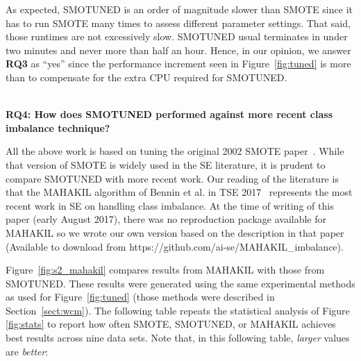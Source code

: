 \documentclass[sigconf]{acmart}
\theoremstyle{break}
\theoremstyle{break}
\newcommand{\sma}{{\sc SMOTE}}
\newcommand{\smb}{{\sc SMOTUNED}}
\begin{document}
As expected,  {\smb} is an order of magnitude slower than {\sma} since
it has to run {\sma} many times to assess different parameter settings.
That said, those runtimes are not excessively slow.
{\smb} usual terminates in under two minutes and never more than half an hour.
Hence, in  our opinion, we answer {\bf RQ3} as ``yes'' since the   performance increment
seen in Figure~\ref{fig:tuned} is more than to compensate for the extra CPU required for {\smb}.

\noindent
{\bf \\RQ4: How does SMOTUNED performed against more recent class imbalance technique?}

All the above work is based on tuning the original 2002 {\sma} paper~\cite{chawla2002smote}. While that
version of {\sma} is widely used in the SE literature, 
it is prudent to compare {\smb} with more recent work.
Our reading
of the literature is that the MAHAKIL algorithm  of Bennin et al. in TSE 2017~\cite{bennin2017mahakil} represents the most recent work in  SE on handling  
class imbalance.  
At the time of writing of this paper (early August 2017), there was no reproduction package available for MAHAKIL so we wrote our own version
based on the description in that paper %
(Available to download from https://github.com/ai-se/MAHAKIL\_imbalance).

Figure~\ref{fig:s2_mahakil} compares   results from MAHAKIL with those from {\smb}. These results
were generated using the same experimental methods as used for   Figure~\ref{fig:tuned} (those methods were described in  Section~\ref{sect:wcm}).
The following table repeats   the statistical analysis of Figure \ref{fig:stats} to report how often
  {\sma}, {\smb}, or MAHAKIL achieves best results across nine data sets.   Note that, in this following table, {\em larger} values are {\em better}:
\end{document}
